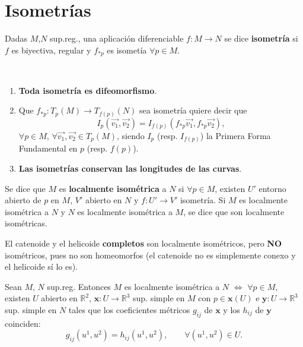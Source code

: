 \documentclass[twoside]{report}
\begin{document}
\section{Isometrías}

\begin{defi}
 Dadas $M$,$N$ sup.reg., una aplicación diferenciable $f:M \longrightarrow N$ se dice \textbf{isometría} si $f$ es biyectiva, regular y  $f_{*p}$ es isometía $\forall p \in M$.
\end{defi}


\begin{nota}

\

\begin{enumerate}
\item \textbf{Toda isometría es difeomorfismo}.

\item
Que $f_{*p}: T_p (M)\rightarrow T_{f(p)}(N)$ sea isometría quiere decir que $$I_p (\overrightarrow{v_1},\overrightarrow{v_2}) = I_{f(p)}(f_{*p}\overrightarrow{v_1},f_{*p}\overrightarrow{v_2}),$$ $\forall p \in M$, $\forall \overrightarrow{v_1},\overrightarrow{v_2} \in T_p(M)$, siendo $I_p$ (resp. $I_{f(p)}$) la Primera Forma Fundamental en $p$ (resp. $f(p)$).
\item \textbf{Las isometrías conservan las longitudes de las curvas}.
\end{enumerate}
\end{nota}


\begin{defi}
Se dice que $M$ es \textbf{localmente isométrica}
 a $N$ si $\forall p \in M$, existen $U'$ entorno abierto de $p$ en $M$, $V'$ abierto en $N$ y $f: U' \rightarrow V'$ isometría. Si $M$ es localmente isométrica a $N$ y $N$ es localmente isométrica a $M$, se dice que son localmente isométricas.
\end{defi}


\begin{ej}
El catenoide y el helicoide \textbf{completos} son localmente isométricos, pero \textbf{NO} isométricos, pues no son homeomorfos (el catenoide no es simplemente conexo y el helicoide sí lo es).
\end{ej}

\begin{teorema}
Sean $M$, $N$ sup.reg. Entonces $M$ es localmente isométrica a $N$ $\Leftrightarrow$ $\forall p \in M$, existen $U$ abierto en $\mathbb{R}^2$, $\textbf{x}: U\rightarrow \mathbb{R}^3$ sup. simple en $M$ con $p\in \textbf{x}(U)$ e $\textbf{y}: U\rightarrow \mathbb{R}^3$ sup. simple en $N$ tales que los coeficientes métricos $g_{ij}$ de $\textbf{x}$ y los $h_{ij}$ de $\textbf{y}$ coinciden: $$g_{ij}(u^1,u^2)= h_{ij}(u^1,u^2), \qquad \forall (u^1,u^2) \in U.$$

\end{teorema}
\end{document}
